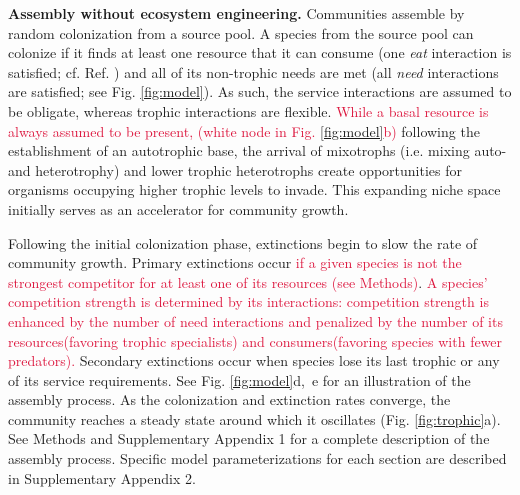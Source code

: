 \documentclass[twocolumn,preprintnumbers,amsmath,amssymb,superscriptaddress,linenumbers]{revtex4-1}
\newcommand{\rev}[1]{\textcolor{crimson}{#1}}
\begin{document}
\vspace{0mm}
\noindent \textbf{Assembly without ecosystem engineering.}
\noindent Communities assemble by random colonization from a source pool.
A species from the source pool can colonize if it finds at least one resource that it can consume (one \emph{eat} interaction is satisfied; cf. Ref. ) and all of its non-trophic needs are met (all \emph{need} interactions are satisfied; see Fig. \ref{fig:model}).
As such, the service interactions are assumed to be obligate, whereas trophic interactions are flexible.
\rev{While a basal resource is always assumed to be present, (white node in Fig. \ref{fig:model}b)} following the establishment of an autotrophic base, the arrival of mixotrophs (i.e. mixing auto- and heterotrophy) and lower trophic heterotrophs create opportunities for organisms occupying higher trophic levels to invade.
This expanding niche space initially serves as an accelerator for community growth.

Following the initial colonization phase, extinctions begin to slow the rate of community growth.
Primary extinctions occur \rev{if a given species is not the strongest competitor for at least one of its resources (see Methods)}.
\rev{A species' competition strength is determined by its interactions: competition strength is enhanced by the number of need interactions and penalized by the number of its resources(favoring trophic specialists) and consumers(favoring species with fewer predators).}
Secondary extinctions occur when species lose its last trophic or any of its service requirements.
See Fig. \ref{fig:model}d,~e for an illustration of the assembly process. 
As the colonization and extinction rates converge, the community reaches a steady state around which it oscillates (Fig. \ref{fig:trophic}a).
See Methods and Supplementary Appendix 1 for a complete description of the assembly process.
Specific model parameterizations for each section are described in Supplementary Appendix 2. %
\end{document}
